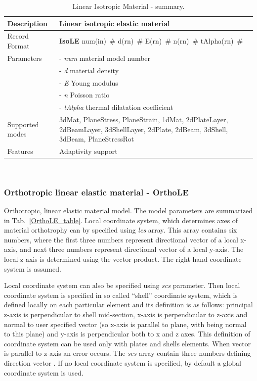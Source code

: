 \documentclass[a4paper]{article}
\newcommand{\descitem}[1]{{\noindent \bf #1}}
\newcommand{\elemparam}[2]{{{#1\tiny (#2)}~\#}}
\newcommand{\param}[1]{{\it #1}}
\newenvironment{mmt}{\begin{tabular}{|l|p{9cm}|}}{\end{tabular}\\}
\newenvironment{mmt}{\begin{tabular}{|l|l|}}{\end{tabular}\\}
\begin{document}
\begin{table}[!htb]
\begin{mmt}
\hline
Description & Linear isotropic elastic material\\
\hline
Record Format & \descitem{IsoLE} \elemparam{num}{in}
\elemparam{d}{rn} \elemparam{E}{rn} \elemparam{n}{rn}
\elemparam{tAlpha}{rn}\\
Parameters &- \param{num} material model number\\
&- \param{d} material density\\
&- \param{E} Young modulus\\
&- \param{n} Poisson ratio\\
&- \param{tAlpha} thermal dilatation coefficient\\
Supported modes& 3dMat, PlaneStress, PlaneStrain, 1dMat,
2dPlateLayer, 2dBeamLayer, 3dShellLayer, 2dPlate, 2dBeam, 3dShell,
3dBeam, PlaneStressRot\\
Features & Adaptivity support\\
\hline
\end{mmt}
\caption{Linear Isotropic Material - summary.}
\label{IsoLE_table}
\end{table}

\subsubsection{Orthotropic linear elastic material - OrthoLE}
\label{OrthoLE}
Orthotropic, linear elastic  material model. The model parameters are summarized
in Tab.~\ref{OrthoLE_table}.
Local coordinate system, which determines axes of material orthotrophy
can by specified using \param{lcs} array. This array contains six numbers,
where the first three numbers represent directional vector of a local x-axis,
and next three numbers represent directional vector of a local y-axis.
The local z-axis is determined using the vector product.
The right-hand coordinate system is assumed.

Local coordinate system
can also be specified using \param{scs} parameter. Then local coordinate
system is specified in so called ``shell''
coordinate system, which is defined locally on each particular element
and its definition is as follows: principal z-axis is perpendicular to
shell mid-section, x-axis is perpendicular to z-axis and normal to
user specified vector (so x-axis is parallel to plane, with  being
normal to this plane) and y-axis is perpendicular both to x and z
axes. This definition of coordinate system can be used only with plates
and shells elements.
When vector  is parallel to z-axis an error occurs. The \param{scs} array contain three numbers
defining direction vector . If no local coordinate system is
specified, by default a global coordinate system is used.
\end{document}
